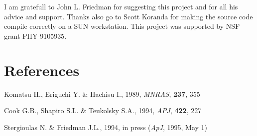 I am gratefull to John L. Friedman for suggesting this project and for all his
advice and support. Thanks also go to Scott Koranda for making the source code
compile correctly on a SUN workstation. This project was supported by NSF
grant PHY-9105935.

\section{References}

Komatsu H., Eriguchi Y. \& Hachisu I., 1989, {\it MNRAS}, {\bf 237}, 355

\<Cook G.B., Shapiro S.L. \& Teukolsky S.A., 1994, {\it APJ}, {\bf 422}, 227

\<Stergioulas N. \& Friedman J.L., 1994, in press ({\it ApJ}, 1995, May 1)

  


